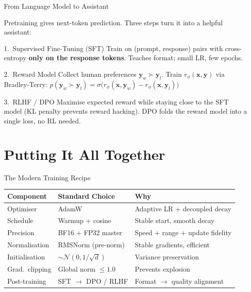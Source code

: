 \documentclass[aspectratio=169, professionalfonts]{beamer}
\begin{document}
\begin{frame}{From Language Model to Assistant}

Pretraining gives next-token prediction. Three steps
turn it into a helpful assistant:

\bigskip

\begin{block}{1.\ Supervised Fine-Tuning (SFT)}
Train on (prompt, response) pairs with cross-entropy
\textbf{only on the response tokens}.
Teaches format; small LR, few epochs.
\end{block}

\begin{block}{2.\ Reward Model}
Collect human preferences $\mathbf{y}_w \succ \mathbf{y}_l$.
Train $r_\phi(\mathbf{x},\mathbf{y})$ via Bradley-Terry:
$p(\mathbf{y}_w\!\succ\!\mathbf{y}_l)
  = \sigma\!\bigl(r_\phi(\mathbf{x},\mathbf{y}_w)
  - r_\phi(\mathbf{x},\mathbf{y}_l)\bigr)$
\end{block}

\begin{block}{3.\ RLHF / DPO}
Maximise expected reward while staying close to the SFT model
(KL penalty prevents reward hacking).
DPO folds the reward model into a single loss, no RL needed.
\end{block}

\end{frame}

\section{Putting It All Together}

\begin{frame}{The Modern Training Recipe}

\begin{center}
\small
\renewcommand{\arraystretch}{1.3}
\begin{tabular}{l l l}
\textbf{Component} & \textbf{Standard Choice} & \textbf{Why} \\[2pt]
\hline
Optimiser & AdamW &
  Adaptive LR + decoupled decay \\
Schedule & Warmup + cosine &
  Stable start, smooth decay \\
Precision & BF16 + FP32 master &
  Speed + range + update fidelity \\
Normalisation & RMSNorm (pre-norm) &
  Stable gradients, efficient \\
Initialisation & $\sim\mathcal{N}(0,1/\sqrt{d})$ &
  Variance preservation \\
Grad.\ clipping & Global norm $\le 1.0$ &
  Prevents explosion \\
Post-training & SFT $\to$ DPO / RLHF &
  Format $\to$ quality alignment
\end{tabular}
\end{center}

\end{frame}
\end{document}
